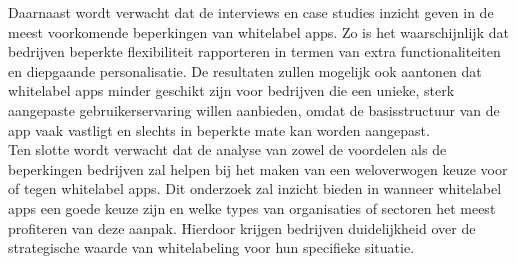 Daarnaast wordt verwacht dat de interviews en case studies inzicht geven in de meest voorkomende beperkingen van whitelabel apps. 
Zo is het waarschijnlijk dat bedrijven beperkte flexibiliteit rapporteren in termen van extra functionaliteiten en diepgaande personalisatie. 
De resultaten zullen mogelijk ook aantonen dat whitelabel apps minder geschikt zijn voor bedrijven die een unieke, sterk aangepaste gebruikerservaring willen aanbieden, omdat de basisstructuur van de app vaak vastligt en slechts in beperkte mate kan worden aangepast.\\

Ten slotte wordt verwacht dat de analyse van zowel de voordelen als de beperkingen bedrijven zal helpen bij het maken van een weloverwogen keuze voor of tegen whitelabel apps. 
Dit onderzoek zal inzicht bieden in wanneer whitelabel apps een goede keuze zijn en welke types van organisaties of sectoren het meest profiteren van deze aanpak. 
Hierdoor krijgen bedrijven duidelijkheid over de strategische waarde van whitelabeling voor hun specifieke situatie.
